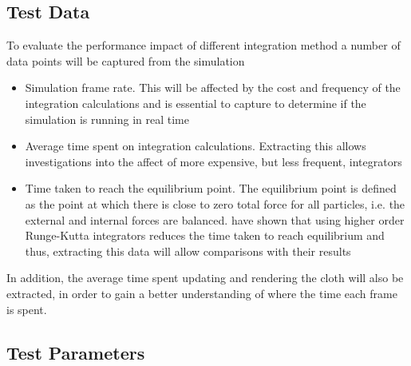 \subsection{Test Data}
To evaluate the performance impact of different integration method a number of data points will be captured from the simulation
\begin{itemize}
\item{Simulation frame rate. This will be affected by the cost and frequency of the integration calculations and is essential to capture to determine if the simulation is running in real time}
\item{Average time spent on integration calculations. Extracting this allows investigations into the affect of more expensive, but less frequent, integrators}
\item{Time taken to reach the equilibrium point. The equilibrium point is defined as the point at which there is close to zero total force for all particles, i.e. the external and internal forces are balanced. \textcite{Wang2009a} have shown that using higher order Runge-Kutta integrators reduces the time taken to reach equilibrium and thus, extracting this data will allow comparisons with their results}
\end{itemize}
In addition, the average time spent updating and rendering the cloth will also be extracted, in order to gain a better understanding of where the time each frame is spent.

\subsection{Test Parameters}


